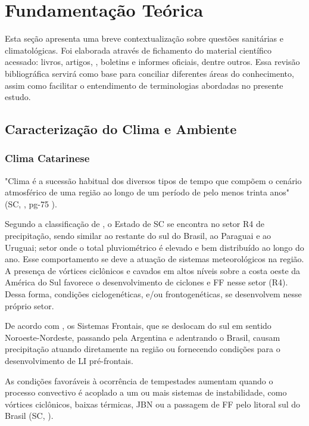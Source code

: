 \chapter{Fundamentação Teórica}

Esta seção apresenta uma breve contextualização sobre questões sanitárias e climatológicas. Foi elaborada através de  fichamento do material científico acessado: livros, artigos, , boletins e informes oficiais, dentre outros. Essa revisão bibliográfica servirá como base para conciliar diferentes áreas do conhecimento, assim como facilitar o entendimento de terminologias abordadas no presente estudo.

\section{Caracterização do Clima e Ambiente}

\subsection{Clima Catarinese}

\indent "Clima é a sucessão habitual dos diversos tipos de tempo que compõem o cenário atmosférico de uma região ao longo de um período de pelo menos trinta anos" (\acrlong{SC}, \citeyear{AtlasSCnatureza}, pg-75 ).

\indent Segundo a classificação de ,  o Estado de \acrlong{SC} se encontra no setor R4 de precipitação, sendo similar ao restante do sul do Brasil, ao Paraguai e ao Uruguai; setor onde o total pluviométrico é elevado e bem distribuído ao longo do ano. Esse comportamento se deve a atuação de sistemas meteorológicos na região. A presença de vórtices ciclônicos e cavados em altos níveis sobre a costa oeste da América do Sul favorece o desenvolvimento de ciclones e \acrlong{FF} nesse setor (R4). Dessa forma, condições ciclogenéticas, e/ou frontogenéticas, se desenvolvem nesse próprio setor.

\indent De acordo com  , os Sistemas Frontais, que se deslocam do sul em sentido Noroeste-Nordeste, passando pela Argentina e adentrando o Brasil, causam precipitação atuando diretamente na região ou fornecendo condições para o desenvolvimento
de \acrfull{LI} pré-frontais.

\indent As condições favoráveis à ocorrência de tempestades aumentam quando o processo convectivo é acoplado a um ou mais sistemas de instabilidade, como vórtices ciclônicos, baixas térmicas, \acrfull{JBN} ou a passagem de \acrlong{FF} pelo litoral sul do Brasil (\acrlong{SC}, \citeyear{AtlasSCnatureza}).

